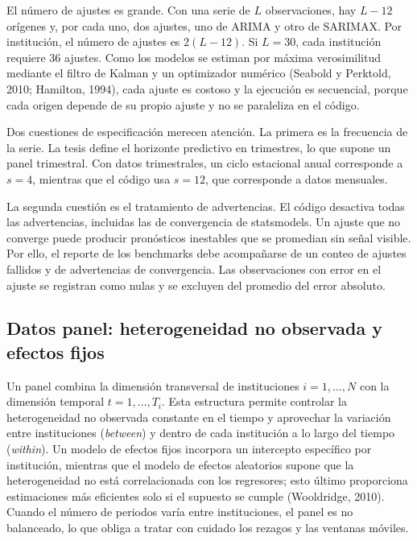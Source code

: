 El número de ajustes es grande. Con una serie de $L$ observaciones, hay $L-12$ orígenes y, por cada uno, dos ajustes, uno de ARIMA y otro de SARIMAX. Por institución, el número de ajustes es $2(L-12)$. Si $L=30$, cada institución requiere 36 ajustes. Como los modelos se estiman por máxima verosimilitud mediante el filtro de Kalman y un optimizador numérico (Seabold y Perktold, 2010; Hamilton, 1994), cada ajuste es costoso y la ejecución es secuencial, porque cada origen depende de su propio ajuste y no se paraleliza en el código.

Dos cuestiones de especificación merecen atención. La primera es la frecuencia de la serie. La tesis define el horizonte predictivo en trimestres, lo que supone un panel trimestral. Con datos trimestrales, un ciclo estacional anual corresponde a $s=4$, mientras que el código usa $s=12$, que corresponde a datos mensuales. %

La segunda cuestión es el tratamiento de advertencias. El código desactiva todas las advertencias, incluidas las de convergencia de statsmodels. Un ajuste que no converge puede producir pronósticos inestables que se promedian sin señal visible. Por ello, el reporte de los benchmarks debe acompañarse de un conteo de ajustes fallidos y de advertencias de convergencia. Las observaciones con error en el ajuste se registran como nulas y se excluyen del promedio del error absoluto.

\subsection{Datos panel: heterogeneidad no observada y efectos fijos}
Un panel combina la dimensión transversal de instituciones $i=1,\dots,N$ con la dimensión temporal $t=1,\dots,T_i$. Esta estructura permite controlar la heterogeneidad no observada constante en el tiempo y aprovechar la variación entre instituciones (\textit{between}) y dentro de cada institución a lo largo del tiempo (\textit{within}). Un modelo de efectos fijos incorpora un intercepto específico por institución, mientras que el modelo de efectos aleatorios supone que la heterogeneidad no está correlacionada con los regresores; esto último proporciona estimaciones más eficientes solo si el supuesto se cumple (Wooldridge, 2010). Cuando el número de periodos varía entre instituciones, el panel es no balanceado, lo que obliga a tratar con cuidado los rezagos y las ventanas móviles.

